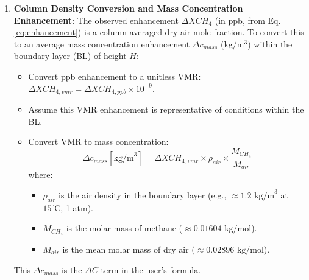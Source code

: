 \documentclass[12pt,a4paper]{article}
\begin{document}
\begin{enumerate}
    \item \textbf{Column Density Conversion and Mass Concentration Enhancement}:
    The observed enhancement $\Delta XCH_4$ (in ppb, from Eq. \ref{eq:enhancement}) is a column-averaged dry-air mole fraction. To convert this to an average mass concentration enhancement $\Delta c_{mass}$ (kg/m$^3$) within the boundary layer (BL) of height $H$:
    \begin{itemize}
        \item Convert ppb enhancement to a unitless VMR: $\Delta XCH_{4,vmr} = \Delta XCH_{4,ppb} \times 10^{-9}$.
        \item Assume this VMR enhancement is representative of conditions within the BL.
        \item Convert VMR to mass concentration:
            \begin{equation}
                \Delta c_{mass} [\text{kg/m}^3] = \Delta XCH_{4,vmr} \times \rho_{air} \times \frac{M_{CH_4}}{M_{air}}
                \label{eq:delta_c_mass}
            \end{equation}
            where:
            \begin{itemize}
                \item $\rho_{air}$ is the air density in the boundary layer (e.g., $\approx 1.2 \text{ kg/m}^3$ at $15^\circ\text{C}$, 1 atm).
                \item $M_{CH_4}$ is the molar mass of methane ($\approx 0.01604 \text{ kg/mol}$).
                \item $M_{air}$ is the mean molar mass of dry air ($\approx 0.02896 \text{ kg/mol}$).
            \end{itemize}
    \end{itemize}
    This $\Delta c_{mass}$ is the $\Delta C$ term in the user's formula.


\end{enumerate}
\end{document}
